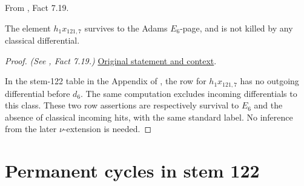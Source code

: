 \begin{fact}
\label{paper:7.19}
From \cite{LWX126}, Fact 7.19.\par
\label{fact:h_1_mul_x_121_7}\label{fact:h1x1217}
    The element $h_1x_{121,7}$ survives to the Adams $E_6$-page, and is not killed by any classical differential.




\end{fact}
\begin{proof}
\textit{(See \cite{LWX126}, Fact 7.19.)} \href{paper/main.tex.html#L2613}{Original statement and context}.

In the stem-122 table in the Appendix of \cite{LWX126}, the row for $h_1x_{121,7}$ has no outgoing differential before $d_6$. The same computation excludes incoming differentials to this class. These two row assertions are respectively survival to $E_6$ and the absence of classical incoming hits, with the same standard label. No inference from the later $\nu$-extension is needed.
\end{proof}

\section{Permanent cycles in stem 122}

